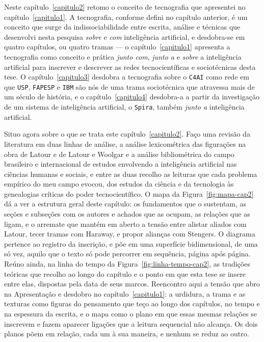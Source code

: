 Neste capítulo~\ref{capitulo2} retomo o conceito de tecnografia que apresentei no capítulo~\ref{capitulo1}. A tecnografia, conforme defini no capítulo anterior, é um conceito que surge da indissociabilidade entre escrita, análise e técnicas que desenvolvi nesta pesquisa \textit{sobre} e \textit{com} inteligência artificial, e desdobra-se em quatro capítulos, ou quatro tramas --- o capítulo~\ref{capitulo1} apresenta a tecnografia como conceito e prática \textit{junto com}, \textit{junto a} e \textit{sobre} a inteligência artificial para inscrever e descrever as redes tecnocientíficas e sociotécnicas desta tese. O capítulo~\ref{capitulo3} desdobra a tecnografia sobre o \texttt{C4AI} como rede em que \texttt{USP}, \texttt{FAPESP} e \texttt{IBM} são nós de uma trama sociotécnica que atravessa mais de um século de história, e o capítulo~\ref{capitulo4} desdobra-a a partir da investigação de um sistema de inteligência artificial, o \texttt{Spira}, também \textit{junto a} inteligência artificial.

Situo agora sobre o que se trata este capítulo~\ref{capitulo2}. Faço uma revisão da literatura em duas linhas de análise, a análise lexicométrica das figurações na obra de Latour e de Latour e Woolgar e a análise bibliométrica do campo brasileiro e internacional de estudos envolvendo a inteligência artificial nas ciências humanas e sociais, e entre as duas recolho as leituras que cada problema empírico do meu campo evocou, dos estudos da ciência e da tecnologia às genealogias críticas do poder tecnocientífico. O mapa da Figura~\ref{fig:mapa-cap2} dá a ver a estrutura geral deste capítulo: os fundamentos que o sustentam, as seções e subseções com os autores e achados que as ocupam, as relações que as ligam, e o arremate que mantém em aberto a tensão entre alistar aliados com Latour, tecer tramas com Haraway, e propor alianças com Stengers. O diagrama pertence ao registro da inscrição, e põe em uma superfície bidimensional, de uma só vez, aquilo que o texto só pode percorrer em sequência, página após página. Reúno ainda, na linha do tempo da Figura~\ref{fig:linha-tempo-cap2}, as tradições teóricas que recolho ao longo do capítulo e o ponto em que esta tese se insere entre elas, dispostas pela data de seus marcos. Reencontro aqui a tensão que abro na Apresentação e desdobro no capítulo~\ref{capitulo1}: a urdidura, a trama e as texturas como figuras do pensamento que teço ao longo dos capítulos, no tempo e na espessura da escrita, e o mapa como o plano em que essas mesmas relações se inscrevem e fazem aparecer ligações que a leitura sequencial não alcança. Os dois planos põem em relação, cada um à sua maneira, e nenhum se reduz ao outro.

